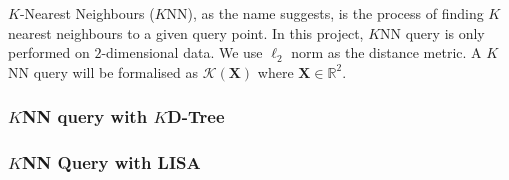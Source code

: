 $K$-Nearest Neighbours ($K$NN), as the name suggests, is the process of finding $K$ nearest neighbours to a given query point. In this project, $K$NN query is only performed on $2$-dimensional data. We use $\ell_2$ norm as the distance metric. A $K$NN query will be formalised as $\mathcal{K}(\boldsymbol{X})$ where $\boldsymbol{X}\in\mathbb{R}^2$.

\subsubsection{$K$NN query with $K$D-Tree}



\subsubsection{$K$NN Query with LISA}


